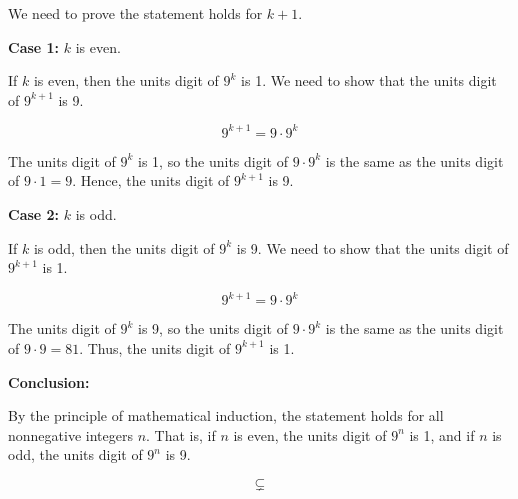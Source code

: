 \documentclass[12pt]{article}
\begin{document}
We need to prove the statement holds for \( k+1 \).

\textbf{Case 1:} \( k \) is even.

If \( k \) is even, then the units digit of \( 9^k \) is 1. We need to show that the units digit of \( 9^{k+1} \) is 9.

\[
9^{k+1} = 9 \cdot 9^k
\]

The units digit of \( 9^k \) is 1, so the units digit of \( 9 \cdot 9^k \) is the same as the units digit of \( 9 \cdot 1 = 9 \). Hence, the units digit of \( 9^{k+1} \) is 9.

\textbf{Case 2:} \( k \) is odd.

If \( k \) is odd, then the units digit of \( 9^k \) is 9. We need to show that the units digit of \( 9^{k+1} \) is 1.

\[
9^{k+1} = 9 \cdot 9^k
\]

The units digit of \( 9^k \) is 9, so the units digit of \( 9 \cdot 9^k \) is the same as the units digit of \( 9 \cdot 9 = 81 \). Thus, the units digit of \( 9^{k+1} \) is 1.

\textbf{Conclusion:}

By the principle of mathematical induction, the statement holds for all nonnegative integers \( n \). That is, if \( n \) is even, the units digit of \( 9^n \) is 1, and if \( n \) is odd, the units digit of \( 9^n \) is 9.

\[
\subsetneq
\]
\end{document}
